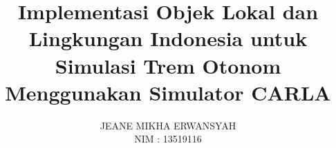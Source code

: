 \documentclass[bahasa, 12pt, a4paper, onecolumn, oneside, final]{report}
\begin{document}
\newcommand{\thedate}{\date{31 Juli 2023}}
\newcommand{\monthyear}{Juli 2023}

\newcommand{\capstonetitle}{Pengembangan Sistem Simulasi \textit{Autonomous Tram} dengan Simulator CARLA}
\newcommand{\thetitle}{Implementasi Objek Lokal dan Lingkungan Indonesia untuk
Simulasi Trem Otonom Menggunakan Simulator CARLA}
\newcommand{\thetitleinenglish}{Implementation of Indonesian Local Objects and
Enviromental Objects for Autonomous Tram Simulation Using CARLA Simulator}

\title{\thetitle}

\newcommand{\subtitle}{
    \bfseries \Large
    Laporan Tugas Akhir - Capstone

    \capstonetitle
}

\newcommand{\authorname}{Jeane Mikha Erwansyah}
\newcommand{\authornim}{13519116}
\author{
    \MakeUppercase{\authorname} \\
    NIM : \authornim
}


\newcommand{\advisoronename}{Achmad Imam Kistijantoro, S.T., M.Sc., Ph.D.}
\newcommand{\advisoronenip}{197308092006041001}
\newcommand{\advisortwoname}{Prof. Dr. Ir. Bambang Riyanto Trilaksono}
\newcommand{\advisortwonip}{196211151987031004}
\newcommand{\advisorapproval}{
    \centering
    \normalsize \normalfont

    \vspace{0.5cm}
    \begin{adjustwidth}{-45pt}{+65pt}
    \setlength{\tabcolsep}{12pt}
    \begin{tabular}{c@{\hskip 0.5cm}c}
        Pembimbing I,               & Pembimbing II,             \\
                                    &                            \\
                                    &                            \\
                                    &                            \\
                                    &                            \\
        \underline{\advisoronename} & \underline{\advisortwoname} \\
        NIP. \advisoronenip     & NIP. \advisortwonip     \\
    \end{tabular}
    \end{adjustwidth}
    }
\end{document}
